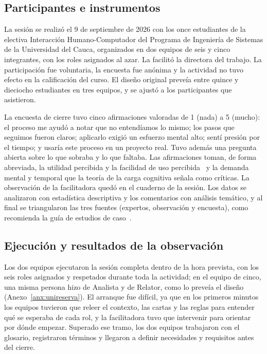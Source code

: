 \documentclass[12pt,letterpaper,oneside]{report}
\begin{document}
\subsection{Participantes e instrumentos}
La sesión se realizó el 9 de septiembre de 2026 con los once estudiantes de la
electiva Interacción Humano-Computador del Programa de Ingeniería de Sistemas de
la Universidad del Cauca, organizados en dos equipos de seis y cinco
integrantes, con los roles asignados al azar. La facilitó la directora del trabajo.
La participación fue voluntaria, la encuesta fue anónima y la
actividad no tuvo efecto en la calificación del curso. El diseño original
preveía entre quince y dieciocho estudiantes en tres equipos, y se ajustó a los
participantes que asistieron.

La encuesta de cierre tuvo cinco afirmaciones valoradas de 1 (nada) a 5
(mucho): el proceso me ayudó a notar que no entendíamos lo mismo; los pasos que
seguimos fueron claros; aplicarlo exigió un esfuerzo mental alto; sentí presión
por el tiempo; y usaría este proceso en un proyecto real. Tuvo además una
pregunta abierta sobre lo que sobraba y lo que faltaba. Las afirmaciones toman,
de forma abreviada, la utilidad percibida y la facilidad de uso
percibida~\cite{davis1989perceived} y la demanda mental y temporal que la teoría
de la carga cognitiva señala como críticas. La observación de la facilitadora
quedó en el cuaderno de la sesión. Los datos se analizaron con estadística
descriptiva y los comentarios con análisis temático, y al final se
triangularon las tres fuentes (expertos, observación y encuesta), como
recomienda la guía de estudios de caso~\cite{runeson2009case}.

\subsection{Ejecución y resultados de la observación}
\label{sec:resultados_caso}
Los dos equipos ejecutaron la sesión completa dentro de la hora prevista, con los
seis roles asignados y respetados durante toda la actividad; en el equipo de
cinco, una misma persona hizo de Analista y de Relator, como lo preveía el
diseño (Anexo~\ref{anx:unireserva}). El arranque fue
difícil, ya que en los primeros minutos los equipos tuvieron que releer el
contexto, las cartas y las reglas para entender qué se esperaba de cada rol, y
la facilitadora tuvo que intervenir para orientar por dónde empezar. Superado
ese tramo, los dos equipos trabajaron con el glosario, registraron términos y
llegaron a definir necesidades y requisitos antes del cierre.
\end{document}
